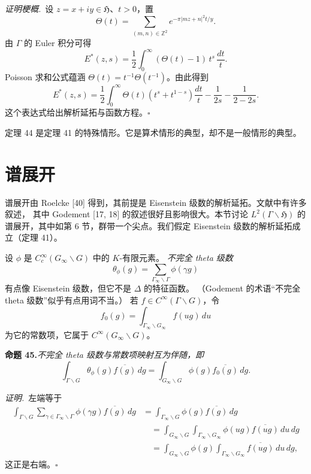 \smallskip
\noindent\emph{证明梗概.}\ 设 $z=x+iy\in\mathfrak{H}$、$t>0$，置
\[
\Theta(t)=\sum_{(m,n)\in\mathbb{Z}^{2}}e^{-\pi|mz+n|^{2}t/y}.
\]
由 $\Gamma$ 的 Euler 积分可得
\[
E^{*}(z,s)=\frac12\int_{0}^{\infty}(\Theta(t)-1)\,t^{s}\,\frac{dt}{t}.
\]
Poisson 求和公式蕴涵 $\Theta(t)=t^{-1}\Theta(t^{-1})$。由此得到
\[
E^{*}(z,s)=\frac12\int_{0}^{\infty}\Theta(t)\left(t^{s}+t^{1-s}\right)\frac{dt}{t}
-\frac{1}{2s}-\frac{1}{2-2s}.
\]
这个表达式给出解析延拓与函数方程。\hfill$\square$

定理 44 是定理 41 的特殊情形。它是算术情形的典型，却不是一般情形的典型。
\section{谱展开}

谱展开由 Roelcke [40] 得到，其前提是 Eisenstein 级数的解析延拓。文献中有许多叙述，
其中 Godement [17, 18] 的叙述很好且影响很大。本节讨论 $L^{2}(\Gamma\backslash\mathfrak{H})$
的谱展开，其中如第 6 节，群带一个尖点。我们假定 Eisenstein 级数的解析延拓成立（定理 41）。

设 $\phi$ 是 $C_{c}^{\infty}(G_{\infty}\backslash G)$ 中的 $K$-有限元素。
\emph{不完全 theta 级数}
\begin{equation}\tag{48}
\theta_{\phi}(g)=\sum_{\Gamma_{\infty}\backslash\Gamma}\phi(\gamma g)
\end{equation}
有点像 Eisenstein 级数，但它不是 $\Delta$ 的特征函数。
（Godement 的术语“不完全 theta 级数”似乎有点用词不当。）
若 $f\in C^{\infty}(\Gamma\backslash G)$，令
\[
f_{0}(g)=\int_{\Gamma_{\infty}\backslash G_{\infty}}f(ug)\,du
\]
为它的常数项，它属于 $C^{\infty}(G_{\infty}\backslash G)$。

\par\medskip\noindent\textbf{命题 45.}\quad\emph{不完全 theta 级数与常数项映射互为伴随，即}
\[
\int_{\Gamma\backslash G}\theta_{\phi}(g)\overline{f(g)}\,dg
=\int_{G_{\infty}\backslash G}\phi(g)\overline{f_{0}(g)}\,dg .
\]

\smallskip
\noindent\emph{证明.}\ 左端等于
\[
\begin{aligned}
\int_{\Gamma\backslash G}\sum_{\gamma\in\Gamma_{\infty}\backslash\Gamma}
\phi(\gamma g)\overline{f(g)}\,dg
&=\int_{\Gamma_{\infty}\backslash G}\phi(g)\overline{f(g)}\,dg\\
&\quad=\int_{G_{\infty}\backslash G}\int_{\Gamma_{\infty}\backslash G_{\infty}}
\phi(ug)\overline{f(ug)}\,du\,dg\\
&\quad=\int_{G_{\infty}\backslash G}\phi(g)\int_{\Gamma_{\infty}\backslash G_{\infty}}
\overline{f(ug)}\,du\,dg,
\end{aligned}
\]
这正是右端。\hfill$\square$

